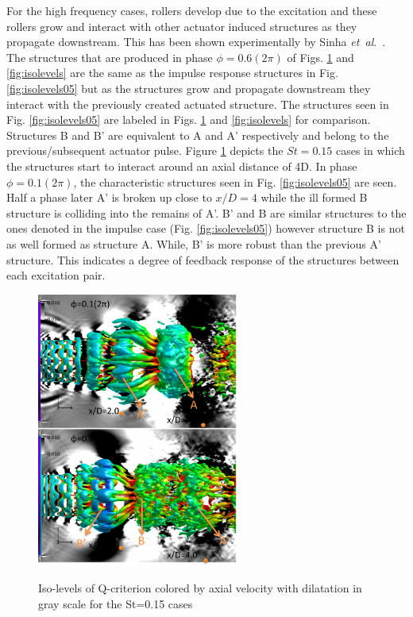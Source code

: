 \documentclass[english]{aiaa-tc}
\newcommand*{\etal}{\textit{et~al}.\ }
\begin{document}
For the high frequency cases, rollers develop due to the excitation and these rollers grow and interact with other actuator induced structures as they propagate downstream. This has been shown experimentally by Sinha \etal \cite{sinha2013}. The structures that are produced in phase $\phi=0.6(2\pi)$ of Figs. \ref{fig:isolevels15} and \ref{fig:isolevels} are the same as the impulse response structures in Fig. \ref{fig:isolevels05} but as the structures grow and propagate downstream they interact with the previously created actuated structure. The structures seen in Fig. \ref{fig:isolevels05} are labeled in Figs. \ref{fig:isolevels15} and \ref{fig:isolevels} for comparison. Structures B and B' are equivalent to A and A' respectively and belong to the previous/subsequent actuator pulse. 
Figure \ref{fig:isolevels15} depicts the $St=0.15$ cases in which the structures start to interact around an axial distance of 4D. In phase $\phi=0.1(2\pi)$, the characteristic structures seen in Fig. \ref{fig:isolevels05} are seen. Half a phase later A' is broken up close to $x/D=4$ while the ill formed B structure is colliding into the remains of A'. B' and B are similar structures to the ones denoted in the impulse case (Fig. \ref{fig:isolevels05}) however structure B is not as well formed as structure A. While, B' is more robust than the previous A' structure. This indicates a degree of feedback response of the structures between each excitation pair. %
\begin{figure}
\begin{center}
\begin{centering}
{\includegraphics[width=2.6in]{M09St015qcritphase0106AB}}
\end{centering}
\caption{Iso-levels of Q-criterion colored by axial velocity with dilatation in gray scale for the St=0.15 cases}
\label{fig:isolevels15}
\end{center}
\end{figure}
\end{document}
